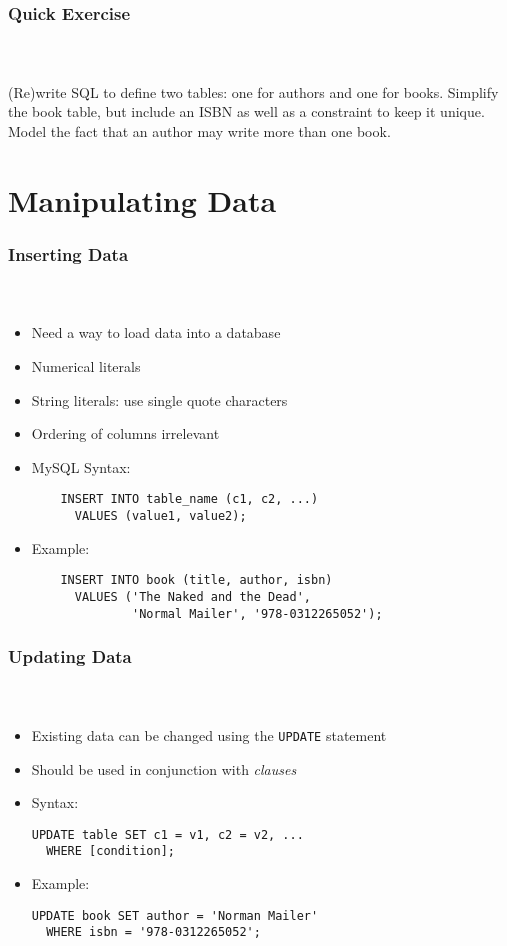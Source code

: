 \documentclass{beamer}
\begin{document}
\begin{frame}
  \frametitle{Quick Exercise}
  \framesubtitle{~}
  
(Re)write SQL to define two tables: one for authors and one for books.
Simplify the book table, but include an ISBN as well as a constraint to
keep it unique.  Model the fact that an author may write more than one 
book.

\end{frame}

\section{Manipulating Data}

\begin{frame}[fragile]
  \frametitle{Inserting Data}
  \framesubtitle{~}

\begin{itemize}
  \item Need a way to load data into a database
  \item Numerical literals
  \item String literals: use single quote characters
  \item Ordering of columns irrelevant
  \item MySQL Syntax: \\
	\begin{verbatim}
	INSERT INTO table_name (c1, c2, ...) 
	  VALUES (value1, value2);
	\end{verbatim}
  \item Example: \\
	\begin{verbatim}
	INSERT INTO book (title, author, isbn) 
	  VALUES ('The Naked and the Dead', 
	          'Normal Mailer', '978-0312265052');
	\end{verbatim}
\end{itemize}

\end{frame}

\begin{frame}[fragile]
  \frametitle{Updating Data}
  \framesubtitle{~}

\begin{itemize}
  \item Existing data can be changed using the \texttt{UPDATE} statement
  \item Should be used in conjunction with \emph{clauses}
  \item Syntax:\\
\begin{verbatim}
UPDATE table SET c1 = v1, c2 = v2, ... 
  WHERE [condition];
\end{verbatim}
  \item Example:
\begin{verbatim}
UPDATE book SET author = 'Norman Mailer' 
  WHERE isbn = '978-0312265052';
\end{verbatim}
\end{itemize}

\end{frame}
\end{document}
